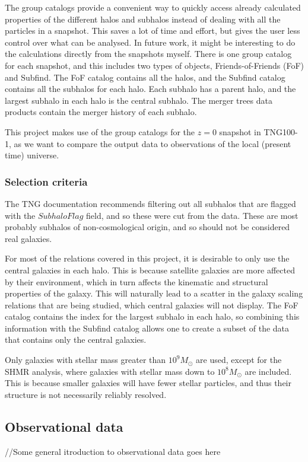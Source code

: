 The group catalogs provide a convenient way to quickly access already calculated properties of the different halos and subhalos instead of dealing with all the particles in a snapshot. This saves a lot of time and effort, but gives the user less control over what can be analysed. In future work, it might be interesting to do the calculations directly from the snapshots myself. There is one group catalog for each snapshot, and this includes two types of objects, Friends-of-Friends (FoF) and Subfind. The FoF catalog contains all the halos, and the Subfind catalog contains all the subhalos for each halo. Each subhalo has a parent halo, and the largest subhalo in each halo is the central subhalo. The merger trees data products contain the merger history of each subhalo.

This project makes use of the group catalogs for the $z = 0$ snapshot in TNG100-1, as we want to compare the output data to observations of the local (present time) universe.

\subsubsection{Selection criteria} %

The TNG documentation recommends filtering out all subhalos that are flagged with the $SubhaloFlag$ field, and so these were cut from the data. These are most probably subhalos of non-cosmological origin, and so should not be considered real galaxies.

For most of the relations covered in this project, it is desirable to only use the central galaxies in each halo. This is because satellite galaxies are more affected by their environment, which in turn affects the kinematic and structural properties of the galaxy. This will naturally lead to a scatter in the galaxy scaling relations that are being studied, which central galaxies will not display. The FoF catalog contains the index for the largest subhalo in each halo, so combining this information with the Subfind catalog allows one to create a subset of the data that contains only the central galaxies.

Only galaxies with stellar mass greater than $10^9 M_{\odot}$ are used, except for the SHMR analysis, where galaxies with stellar mass down to $10^8 M_{\odot}$ are included. This is because smaller galaxies will have fewer stellar particles, and thus their structure is not necessarily reliably resolved.

\subsection{Observational data}
//Some general itroduction to observational data goes here

